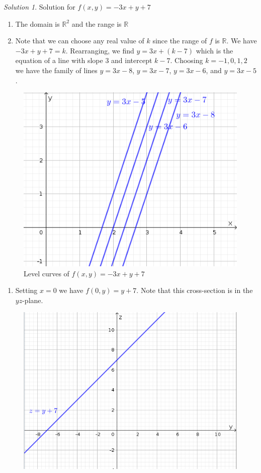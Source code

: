 \documentclass[
]{book}
\providecommand{\tightlist}{%
  \setlength{\itemsep}{0pt}\setlength{\parskip}{0pt}}
\theoremstyle{definition}
\theoremstyle{definition}
\theoremstyle{definition}
\theoremstyle{definition}
\theoremstyle{remark}
\newtheorem*{solution}{Solution}
\begin{document}
\begin{solution}

Solution for \(f(x,y)=-3x+y+7\)

\begin{enumerate}
\def\labelenumi{\alph{enumi}.}
\item
  The domain is \(\mathbb{R}^2\) and the range is \(\mathbb{R}\)
\item
  Note that we can choose any real value of \(k\) since the range of \(f\) is \(\mathbb{R}\). We have \(-3x+y+7=k\). Rearranging, we find \(y=3x+(k-7)\) which is the equation of a line with slope \(3\) and intercept \(k-7\). Choosing \(k=-1,0,1,2\) we have the family of lines \(y=3x-8\), \(y=3x-7\), \(y=3x-6\), and \(y=3x-5\).
\end{enumerate}

\begin{figure}

{\centering \includegraphics[width=0.5\linewidth]{images/lc-f} 

}

\caption{Level curves of $f(x,y)=-3x+y+7$}\label{fig:unnamed-chunk-2}
\end{figure}

\begin{enumerate}
\def\labelenumi{\alph{enumi}.}
\setcounter{enumi}{2}
\tightlist
\item
  Setting \(x=0\) we have \(f(0,y)=y+7\). Note that this cross-section is in the \(yz\)-plane.
\end{enumerate}

\begin{figure}

{\centering \includegraphics[width=0.5\linewidth]{images/x0-f} 

}
\end{figure}
\end{solution}
\end{document}
